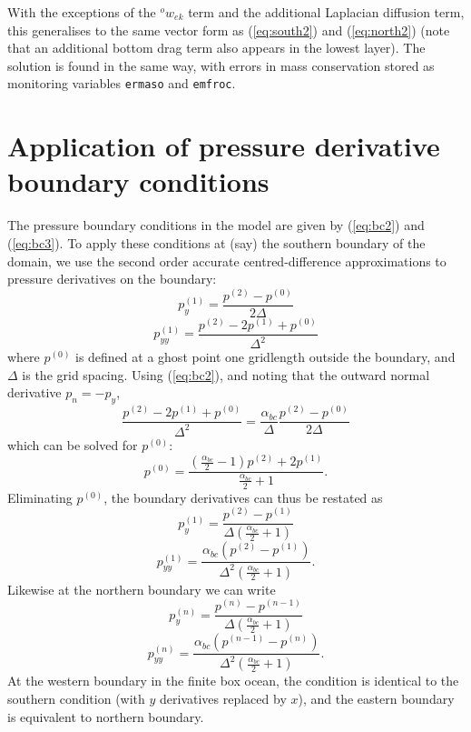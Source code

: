 \documentclass[11pt, a4paper,twoside]{article}
\newcommand{\ek}[1]{{{}^{#1}w_{ek}}}
\newcommand{\alphbc}[1]{{}^{#1}\alpha_{bc}}
\numberwithin{equation}{section}
\begin{document}
With the exceptions of the $\ek{o}$ term and the additional Laplacian diffusion term, this generalises to the same vector form as (\ref{eq:south2}) and (\ref{eq:north2}) (note that an additional bottom drag term also appears in the lowest layer).
The solution is found in the same way, with errors in mass conservation stored as monitoring variables \verb=ermaso= and \verb=emfroc=.


\section{Application of pressure derivative boundary conditions}\label{app:bcs}
The pressure boundary conditions in the model are given by (\ref{eq:bc2}) and (\ref{eq:bc3}).
To apply these conditions at (say) the southern boundary of the domain, we use the second order accurate centred-difference approximations to pressure derivatives on the boundary:
\begin{equation}
p^{(1)}_y = \frac{p^{(2)} - p^{(0)}}{2 \Delta}
\end{equation}
\begin{equation}
p^{(1)}_{yy} = \frac{p^{(2)} -2p^{(1)} + p^{(0)}}{\Delta^2}
\end{equation}
where $p^{(0)}$ is defined at a ghost point one gridlength outside the boundary, and $\Delta$ is the grid spacing.
Using (\ref{eq:bc2}), and noting that the outward normal derivative $p_n = -p_y$,
\begin{equation}
\frac{p^{(2)} -2p^{(1)} + p^{(0)}}{\Delta^2} = \frac{\alphbc{}}{\Delta} \frac{p^{(2)} - p^{(0)}}{2 \Delta}\end{equation}
which can be solved for $p^{(0)}$:
\begin{equation}p^{(0)} = \frac{(\frac{\alphbc{}}{2} - 1)p^{(2)} + 2p^{(1)}}{\frac{\alphbc{}}{2} + 1}.\end{equation}
Eliminating $p^{(0)}$, the boundary derivatives can thus be restated as
\begin{equation}p^{(1)}_y = \frac{p^{(2)} - p^{(1)}}{\Delta (\frac{\alphbc{}}{2} + 1)}\end{equation}
\begin{equation}p^{(1)}_{yy} = \frac{\alphbc{} (p^{(2)} - p^{(1)})}{\Delta^2 (\frac{\alphbc{}}{2} + 1)}.\end{equation}
Likewise at the northern boundary we can write
\begin{equation}p^{(n)}_y = \frac{p^{(n)} - p^{(n-1)}}{\Delta (\frac{\alphbc{} }{2} + 1)}\end{equation}
\begin{equation}p^{(n)}_{yy} = \frac{\alphbc{}  (p^{(n-1)} - p^{(n)})}{\Delta^2 (\frac{\alphbc{} }{2} + 1)}.\end{equation}
At the western boundary in the finite box ocean, the condition is identical to the southern condition (with $y$ derivatives replaced by $x$), and the eastern boundary is equivalent to northern boundary.
\end{document}
